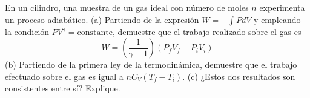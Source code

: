 \item En un cilindro, una muestra de un gas ideal con número de moles $n$ experimenta un proceso adiabático. 
(a) Partiendo de la expresión $W = -\int P dV$ y empleando la condición $PV^\gamma = \text{constante}$, demuestre que el trabajo realizado sobre el gas es
$$ W = \left( \frac{1}{\gamma - 1} \right) (P_fV_f - P_iV_i) $$
(b) Partiendo de la primera ley de la termodinámica, demuestre que el trabajo efectuado sobre el gas es igual a $nC_V(T_f - T_i)$. 
(c) ¿Estos dos resultados son consistentes entre sí? Explique.
